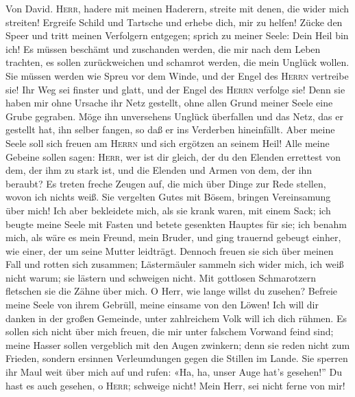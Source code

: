  Von David. \textsc{Herr}, hadere mit meinen Haderern,
streite mit denen, die wider mich streiten!  Ergreife
Schild und Tartsche und erhebe dich, mir zu helfen!  Zücke
den Speer und tritt meinen Verfolgern entgegen; sprich zu meiner Seele:
Dein Heil bin ich!  Es müssen beschämt und zuschanden
werden, die mir nach dem Leben trachten, es sollen zurückweichen und
schamrot werden, die mein Unglück wollen.  Sie müssen
werden wie Spreu vor dem Winde, und der Engel des \textsc{Herrn}
vertreibe sie!  Ihr Weg sei finster und glatt, und der
Engel des \textsc{Herrn} verfolge sie!  Denn sie haben mir
ohne Ursache ihr Netz gestellt, ohne allen Grund meiner Seele eine Grube
gegraben.  Möge ihn unversehens Unglück überfallen und das
Netz, das er gestellt hat, ihn selber fangen, so daß er ins Verderben
hineinfällt.  Aber meine Seele soll sich freuen am
\textsc{Herrn} und sich ergötzen an seinem Heil!  Alle
meine Gebeine sollen sagen: \textsc{Herr}, wer ist dir gleich, der du
den Elenden errettest von dem, der ihm zu stark ist, und die Elenden und
Armen von dem, der ihn beraubt?  Es treten freche Zeugen
auf, die mich über Dinge zur Rede stellen, wovon ich nichts weiß.
 Sie vergelten Gutes mit Bösem, bringen Vereinsamung über
mich!  Ich aber bekleidete mich, als sie krank waren, mit
einem Sack; ich beugte meine Seele mit Fasten und betete gesenkten
Hauptes für sie;  ich benahm mich, als wäre es mein
Freund, mein Bruder, und ging trauernd gebeugt einher, wie einer, der um
seine Mutter leidträgt.  Dennoch freuen sie sich über
meinen Fall und rotten sich zusammen; Lästermäuler sammeln sich wider
mich, ich weiß nicht warum; sie lästern und schweigen nicht.
 Mit gottlosen Schmarotzern fletschen sie die Zähne über
mich.  O Herr, wie lange willst du zusehen? Befreie meine
Seele von ihrem Gebrüll, meine einsame von den Löwen! 
Ich will dir danken in der großen Gemeinde, unter zahlreichem Volk will
ich dich rühmen.  Es sollen sich nicht über mich freuen,
die mir unter falschem Vorwand feind sind; meine Hasser sollen
vergeblich mit den Augen zwinkern;  denn sie reden nicht
zum Frieden, sondern ersinnen Verleumdungen gegen die Stillen im Lande.
 Sie sperren ihr Maul weit über mich auf und rufen: «Ha,
ha, unser Auge hat's gesehen!''  Du hast es auch gesehen,
o \textsc{Herr}; schweige nicht! Mein Herr, sei nicht ferne von mir!
